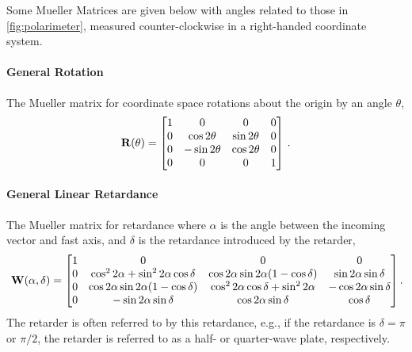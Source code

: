 Some Mueller Matrices are given below with angles related to those in \autoref{fig:polarimeter}, measured counter-clockwise in a right-handed coordinate system.

\paragraph{General Rotation}
The Mueller matrix for coordinate space rotations about the origin by an angle $\theta$,
\begin{equation} \label{matrix:rotate}
    \mathbf{R}(\theta) =
    \begin{bmatrix}
        1 & 0              & 0             & 0 \\
        0 & \cos 2 \theta  & \sin 2 \theta & 0 \\
        0 & -\sin 2 \theta & \cos 2 \theta & 0 \\
        0 & 0              & 0             & 1 \\
    \end{bmatrix}\,.
\end{equation}

\pagebreak

\paragraph{General Linear Retardance}
The Mueller matrix for retardance where $\alpha$ is the angle between the incoming vector and fast axis, and $\delta$ is the retardance introduced by the retarder,
\begin{equation} \label{matrix:retarder}
    \matr{W}(\alpha, \delta) =
    \begin{bmatrix}
        1 & 0                                                 & 0                                                 & 0                          \\
        0 & \cos^{2} 2 \alpha + \sin^{2} 2 \alpha \cos \delta & \cos 2 \alpha \sin 2 \alpha  (1 - \cos \delta)    & \sin 2 \alpha \sin \delta  \\
        0 & \cos 2 \alpha \sin 2 \alpha  (1 - \cos \delta)    & \cos^{2} 2 \alpha \cos \delta + \sin^{2} 2 \alpha & -\cos 2 \alpha \sin \delta \\
        0 & -\sin 2 \alpha \sin \delta                        & \cos 2 \alpha \sin \delta                         & \cos \delta                \\
    \end{bmatrix}\rlap{.} 
\end{equation}
The retarder is often referred to by this retardance, e.g., if the retardance is $\delta = \pi$ or $\pi / 2$, the retarder is referred to as a half- or quarter-wave plate, respectively.

